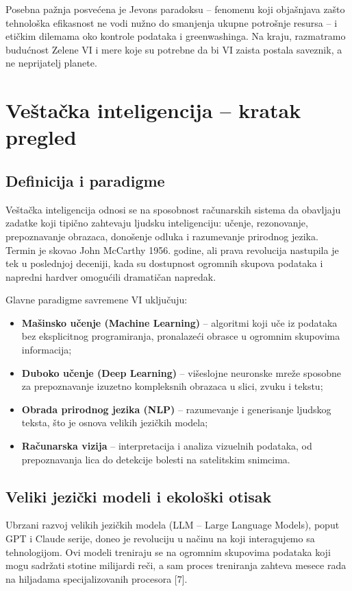 \documentclass[12pt,a4paper]{article}
\begin{document}
Posebna pažnja posvećena je Jevons paradoksu -- fenomenu koji objašnjava zašto tehnološka efikasnost ne vodi nužno do smanjenja ukupne potrošnje resursa -- i etičkim dilemama oko kontrole podataka i greenwashinga. Na kraju, razmatramo budućnost Zelene VI i mere koje su potrebne da bi VI zaista postala saveznik, a ne neprijatelj planete.

\section{Veštačka inteligencija -- kratak pregled}

\subsection{Definicija i paradigme}
Veštačka inteligencija odnosi se na sposobnost računarskih sistema da obavljaju zadatke koji tipično zahtevaju ljudsku inteligenciju: učenje, rezonovanje, prepoznavanje obrazaca, donošenje odluka i razumevanje prirodnog jezika. Termin je skovao John McCarthy 1956. godine, ali prava revolucija nastupila je tek u poslednjoj deceniji, kada su dostupnost ogromnih skupova podataka i napredni hardver omogućili dramatičan napredak.

Glavne paradigme savremene VI uključuju:
\begin{itemize}
    \item \textbf{Mašinsko učenje (Machine Learning)} -- algoritmi koji uče iz podataka bez eksplicitnog programiranja, pronalazeći obrasce u ogromnim skupovima informacija;
    \item \textbf{Duboko učenje (Deep Learning)} -- višeslojne neuronske mreže sposobne za prepoznavanje izuzetno kompleksnih obrazaca u slici, zvuku i tekstu;
    \item \textbf{Obrada prirodnog jezika (NLP)} -- razumevanje i generisanje ljudskog teksta, što je osnova velikih jezičkih modela;
    \item \textbf{Računarska vizija} -- interpretacija i analiza vizuelnih podataka, od prepoznavanja lica do detekcije bolesti na satelitskim snimcima.
\end{itemize}

\subsection{Veliki jezički modeli i ekološki otisak}
Ubrzani razvoj velikih jezičkih modela (LLM -- Large Language Models), poput GPT i Claude serije, doneo je revoluciju u načinu na koji interagujemo sa tehnologijom. Ovi modeli treniraju se na ogromnim skupovima podataka koji mogu sadržati stotine milijardi reči, a sam proces treniranja zahteva mesece rada na hiljadama specijalizovanih procesora [7].
\end{document}
